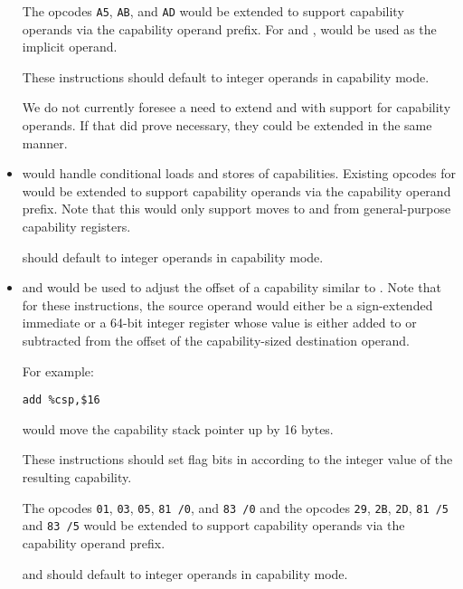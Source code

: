 \begin{itemize}
    The opcodes \texttt{A5}, \texttt{AB}, and \texttt{AD} would be
    extended to support capability operands via the capability operand
    prefix.  For  and , \CAX{} would
    be used as the implicit operand.

    These instructions should default to integer operands in
    capability mode.

    We do not currently foresee a need to extend  and
     with support for capability operands.  If that
    did prove necessary, they could be extended in the same manner.

  \item {} would handle conditional loads and stores of
    capabilities.  Existing opcodes for  would be
    extended to support capability operands via the capability operand
    prefix.  Note that this would only support moves to and from
    general-purpose capability registers.

     should default to integer operands in
    capability mode.

  \item {} and  would be used to adjust
    the offset of a capability similar to .  Note
    that for these instructions, the source operand would either be a
    sign-extended immediate or a 64-bit integer register whose value
    is either added to or subtracted from the offset of the
    capability-sized destination operand.

    For example:

\begin{verbatim}
add %csp,$16
\end{verbatim}

    would move the capability stack pointer up by 16 bytes.

    These instructions should set flag bits in \RFLAGS{} according to
    the integer value of the resulting capability.

    The  opcodes \texttt{01}, \texttt{03}, \texttt{05},
    \texttt{81 /0}, and \texttt{83 /0} and the 
    opcodes \texttt{29}, \texttt{2B}, \texttt{2D}, \texttt{81 /5} and
    \texttt{83 /5} would be extended to support capability operands
    via the capability operand prefix.

     and  should default to integer
    operands in capability mode.


\end{itemize}
